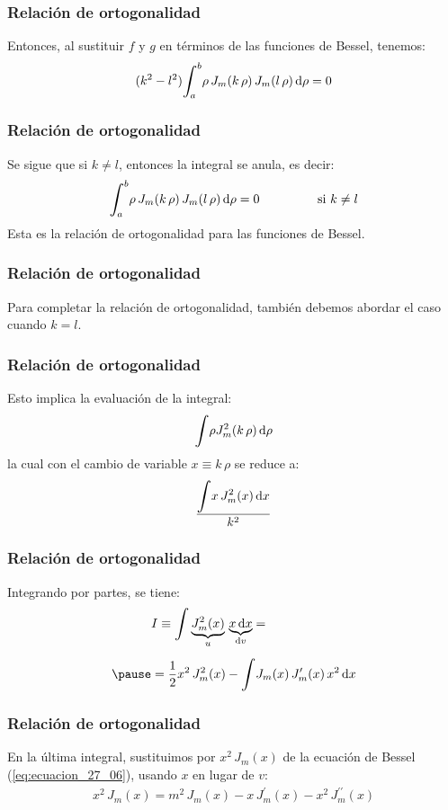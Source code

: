 \documentclass[12pt]{beamer}
\begin{document}
\begin{frame}
\frametitle{Relación de ortogonalidad}
Entonces, al sustituir $f$ y $g$ en términos de las funciones de Bessel, tenemos:
\pause
\begin{align*}
(k^{2} - l^{2}) \scaleint{6ex}_{\bs a}^{b} \rho \, J_{m} (k \, \rho) \, J_{m}(l \, \rho) \dd{\rho} = 0
\end{align*}
\end{frame}
\begin{frame}
\frametitle{Relación de ortogonalidad}
Se sigue que si $k \neq l$, entonces la integral se anula, es decir:
\pause
\begin{equation}
\scaleint{6ex}_{\bs a}^{b} \rho \, J_{m} (k \, \rho) \, J_{m}(l \, \rho) \dd{\rho} = 0 \hspace{1.5cm} \mbox{ si } k \neq l
\label{eq:ecuacion_27_20}
\end{equation}
\pause
Esta es la relación de ortogonalidad para las funciones de Bessel.
\end{frame}
\begin{frame}
\frametitle{Relación de ortogonalidad}
Para completar la relación de ortogonalidad, también debemos abordar el caso cuando $k = l$.
\end{frame}
\begin{frame}
\frametitle{Relación de ortogonalidad}
Esto implica la evaluación de la integral:
\pause
\begin{align*}
\displaystyle \scaleint{6ex} \rho J_{m}^{2} ( k \, \rho) \dd{\rho}
\end{align*}
\pause
la cual con el cambio de variable $x \equiv k \, \rho$ se reduce a:
\pause
\begin{align*}
\dfrac{\displaystyle \scaleint{6ex} x \, J_{m}^{2} (x) \dd{x}}{k^{2}}
\end{align*}
\end{frame}
\begin{frame}
\frametitle{Relación de ortogonalidad}
Integrando por partes, se tiene:
\pause
\begin{eqnarray*}
\begin{aligned}
&I \equiv \scaleint{6ex}  \underbrace{J_{m}^{2} (x)}_{u} \, \underbrace{x \dd{x}}_{\dd{v}} = \\[0.5em] \pause
&= \dfrac{1}{2} x^{2} \, J_{m}^{2} (x)
 - \scaleint{6ex} J_{m}(x) \, J_{m}^{\prime} (x) \, x^{2} \dd{x}
\end{aligned}
\end{eqnarray*}
\end{frame}
\begin{frame}
\frametitle{Relación de ortogonalidad}
En la última integral, sustituimos por $x^{2} \, J_{m} (x)$ de la ecuación de Bessel (\ref{eq:ecuacion_27_06}), usando $x$ en lugar de $v$:
\pause
\begin{align*}
x^{2} \, J_{m} (x) =  m^{2} \, J_{m}(x) - x \, J_{m}^{\prime} (x) - x^{2} \, J_{m}^{\prime \prime} (x)
\end{align*}
\end{frame}
\end{document}
